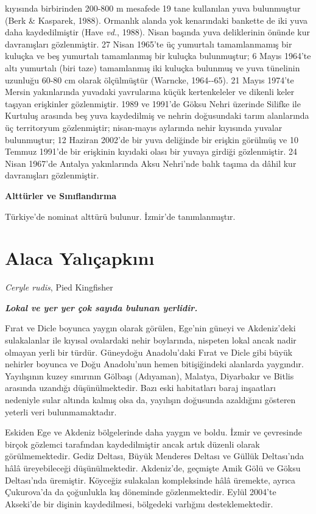 \documentclass[
  10.5pt,
  a4paper,
  DIV=11,
  numbers=noendperiod,
  twocolumn]{scrreprt}
\begin{document}
kıyısında birbirinden 200-800 m mesafede 19 tane kullanılan yuva
bulunmuştur (Berk \& Kasparek, 1988). Ormanlık alanda yok kenarındaki
bankette de iki yuva daha kaydedilmiştir (Have \emph{vd.}, 1988). Nisan
başında yuva deliklerinin önünde kur davranışları gözlenmiştir. 27 Nisan
1965'te üç yumurtalı tamamlanmamış bir kuluçka ve beş yumurtalı
tamamlanmış bir kuluçka bulunmuştur; 6 Mayıs 1964'te altı yumurtalı
(biri taze) tamamlanmış iki kuluçka bulunmuş ve yuva tünelinin uzunluğu
60-80 cm olarak ölçülmüştür (Warncke, 1964-\/-65). 21 Mayıs 1974'te
Mersin yakınlarında yuvadaki yavrularına küçük kertenkeleler ve dikenli
keler taşıyan erişkinler gözlenmiştir. 1989 ve 1991'de Göksu Nehri
üzerinde Silifke ile Kurtuluş arasında beş yuva kaydedilmiş ve nehrin
doğusundaki tarım alanlarında üç territoryum gözlenmiştir; nisan-mayıs
aylarında nehir kıyısında yuvalar bulunmuştur; 12 Haziran 2002'de bir
yuva deliğinde bir erişkin görülmüş ve 10 Temmuz 1991'de bir erişkinin
kıyıdaki olası bir yuvaya girdiği gözlenmiştir. 24 Nisan 1967'de Antalya
yakınlarında Aksu Nehri'nde balık taşıma da dâhil kur davranışları
gözlenmiştir.

\textbf{Alttürler ve Sınıflandırma}

Türkiye'de nominat alttürü bulunur. İzmir'de tanımlanmıştır.

\section{Alaca Yalıçapkını}\label{alaca-yalux131uxe7apkux131nux131}

\emph{Ceryle rudis}, Pied Kingfisher

\textbf{\emph{Lokal ve yer yer çok sayıda bulunan yerlidir.}}

Fırat ve Dicle boyunca yaygın olarak görülen, Ege'nin güneyi ve
Akdeniz'deki sulakalanlar ile kıyısal ovalardaki nehir boylarında,
nispeten lokal ancak nadir olmayan yerli bir türdür. Güneydoğu
Anadolu'daki Fırat ve Dicle gibi büyük nehirler boyunca ve Doğu
Anadolu'nun hemen bitişiğindeki alanlarda yaygındır. Yayılışının kuzey
sınırının Gölbaşı (Adıyaman), Malatya, Diyarbakır ve Bitlis arasında
uzandığı düşünülmektedir. Bazı eski habitatları baraj inşaatları
nedeniyle sular altında kalmış olsa da, yayılışın doğusunda azaldığını
gösteren yeterli veri bulunmamaktadır.

Eskiden Ege ve Akdeniz bölgelerinde daha yaygın ve boldu. İzmir ve
çevresinde birçok gözlemci tarafından kaydedilmiştir ancak artık düzenli
olarak görülmemektedir. Gediz Deltası, Büyük Menderes Deltası ve Güllük
Deltası'nda hâlâ üreyebileceği düşünülmektedir. Akdeniz'de, geçmişte
Amik Gölü ve Göksu Deltası'nda üremiştir. Köyceğiz sulakalan
kompleksinde hâlâ üremekte, ayrıca Çukurova'da da çoğunlukla kış
döneminde gözlenmektedir. Eylül 2004'te Akseki'de bir dişinin
kaydedilmesi, bölgedeki varlığını desteklemektedir.
\end{document}

